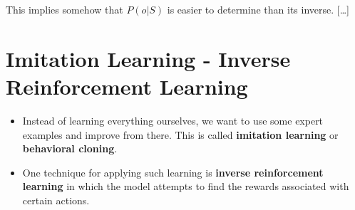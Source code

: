 \documentclass[
]{book}
\providecommand{\tightlist}{%
  \setlength{\itemsep}{0pt}\setlength{\parskip}{0pt}}
\begin{document}
This implies somehow that \(P(o|S)\) is easier to determine than its
inverse. {[}\ldots{]}

\hypertarget{imitation-learning---inverse-reinforcement-learning}{%
\chapter{Imitation Learning - Inverse Reinforcement
Learning}\label{imitation-learning---inverse-reinforcement-learning}}

\begin{itemize}
\tightlist
\item
  Instead of learning everything ourselves, we want to use some expert
  examples and improve from there. This is called \textbf{imitation
  learning} or \textbf{behavioral cloning}.
\item
  One technique for applying such learning is \textbf{inverse
  reinforcement learning} in which the model attempts to find the
  rewards associated with certain actions.
\end{itemize}
\end{document}

